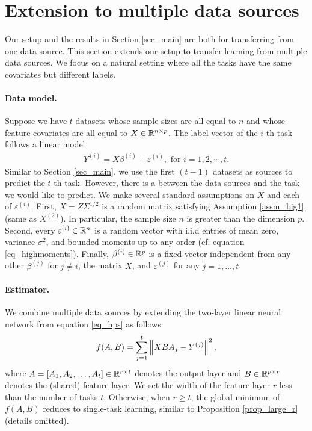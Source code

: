 \section{Extension to multiple data sources}\label{sec_same}

Our setup and the results in Section \ref{sec_main} are both for transferring from one data source.
This section extends our setup to transfer learning from multiple data sources.
We focus on a natural setting where all the tasks have the same covariates but different labels.

\paragraph{Data model.} Suppose we have $t$ datasets whose sample sizes are all equal to $n$ and whose feature covariates are all equal to $X \in \mathbb{R}^{n \times p}$. The label vector of the $i$-th task follows a linear model
\begin{align}\label{eq_mtl_data}
    Y^{(i)} = X \beta^{(i)} + \varepsilon^{(i)}, \text{ for } i=1, 2,\cdots, t.
\end{align}
Similar to Section \ref{sec_main}, we use the first $(t-1)$ datasets as sources to predict the $t$-th task.
However, there is a  between the data sources and the task we would like to predict.
We make several standard assumptions on $X$ and each of $\varepsilon^{(i)}$.
First, $X = Z\Sigma^{1/2}$ is a random matrix satisfying Assumption \ref{assm_big1} (same as $X^{(2)}$).
In particular, the sample size $n$ is greater than the dimension $p$.
Second, every $\varepsilon^{(i)} \in \mathbb{R}^{n}$ is a random vector with i.i.d entries of mean zero, variance $\sigma^2$, and bounded moments up to any order (cf. equation \eqref{eq_highmoments}).
Finally, $\beta^{(i)} \in \mathbb{R}^{p}$ is a fixed vector independent from any other $\beta^{(j)}$ for $j \neq i$, the matrix $X$, and $\varepsilon^{(j)}$ for any $j=1,\dots,t$.

\paragraph{Estimator.} We combine multiple data sources by extending the two-layer linear neural network from equation \eqref{eq_hps} as follows:
\begin{align}
	f(A, B) = \sum_{j=1}^t \bignorm{X B A_j - Y^{(j)}}^2, \label{eq_mtl_same_cov}
\end{align}
where $A = [A_1, A_2, \dots, A_t] \in \mathbb{R}^{r \times t}$ denotes the output layer and $B \in \mathbb{R}^{p \times r}$ denotes the (shared) feature layer.
We set the width of the feature layer $r$ less than the number of tasks $t$.
Otherwise, when $r \ge t$, the global minimum of $f(A, B)$ reduces to single-task learning, similar to Proposition \ref{prop_large_r} (details omitted).


